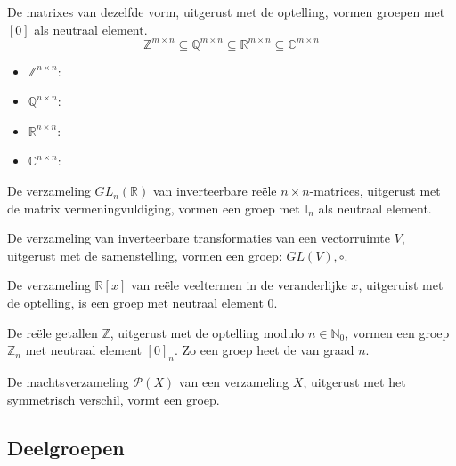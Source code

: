 \documentclass[main.tex]{subfiles}
\begin{document}
\begin{vb}
  De matrixes van dezelfde vorm, uitgerust met de optelling, vormen groepen met $[0]$ als neutraal element.
  \[ \mathbb{Z}^{m \times n} \subseteq \mathbb{Q}^{m \times n} \subseteq \mathbb{R}^{m \times n} \subseteq \mathbb{C}^{m \times n} \]
  \begin{itemize}
  \item $\mathbb{Z}^{n \times n}$: 
  \item $\mathbb{Q}^{n \times n}$: \cycln
  \item $\mathbb{R}^{n \times n}$: \cycln
  \item $\mathbb{C}^{n \times n}$: \cycln
  \end{itemize}
\commn
\end{vb}

\begin{vb}
  De verzameling $GL_{n}(\mathbb{R})$ van inverteerbare re\"ele $n\times n$-matrices, uitgerust met de matrix vermeningvuldiging, vormen een groep met $\mathbb{I}_{n}$ als neutraal element.\\
\commn \cycln
\end{vb}

\begin{vb}
  De verzameling van inverteerbare transformaties van een vectorruimte $V$, uitgerust met de samenstelling, vormen een groep: $GL(V),\circ$.
\commn \cycln
\end{vb}

\begin{vb}
  De verzameling $\mathbb{R}[x]$ van re\"ele veeltermen in de veranderlijke $x$, uitgeruist met de optelling, is een groep met neutraal element $0$.\\
\commj \cycln
\end{vb}

\begin{vb}
  De re\"ele getallen $\mathbb{Z}$, uitgerust met de optelling modulo $n\in \mathbb{N}_{0}$, vormen een groep $\mathbb{Z}_{n}$ met neutraal element $[0]_{n}$. Zo een groep heet de  van graad $n$.\\
\commj {}
\end{vb}

\begin{vb}
  De machtsverzameling $\mathcal{P}(X)$ van een verzameling $X$, uitgerust met het symmetrisch verschil, vormt een groep.
\commj \cycln
\end{vb}

\subsection{Deelgroepen}
\end{document}
